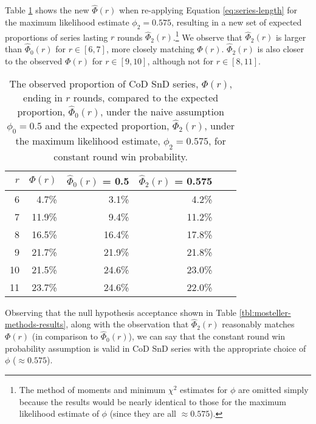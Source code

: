 \documentclass{article}
\begin{document}
Table \ref{tbl:alternative-constant-ps} shows the new \(\hat{\Phi}(r)\)
when re-applying Equation \ref{eq:series-length} for the maximum
likelihood estimate \(\phi_2 = 0.575\), resulting in a new set of
expected proportions of series lasting \(r\) rounds
\(\hat{\Phi}_2(r)\).\footnote{The method of moments and minimum
  \(\chi^2\) estimates for \(\phi\) are omitted simply because the
  results would be nearly identical to those for the maximum likelihood
  estimate of \(\phi\) (since they are all \(\approx 0.575\)).} We
observe that \(\hat{\Phi}_2(r)\) is larger than \(\hat{\Phi}_0(r)\) for
\(r \in [6, 7]\), more closely matching \(\Phi(r)\). \(\hat{\Phi}_2(r)\)
is also closer to the observed \(\Phi(r)\) for \(r \in [9, 10]\),
although not for \(r \in [8, 11]\).

\begin{table}
\caption{The observed proportion of CoD SnD series, $\Phi(r)$, ending in $r$ rounds, compared to the expected proportion, $\hat{\Phi}_0(r)$, under the naive assumption $\phi_0 = 0.5$ and the expected proportion, $\hat{\Phi}_2(r)$, under the maximum likelihood estimate, $\phi_2 = 0.575$, for constant round win probability.}

\centering
\begin{tabular}{rrrrrr}
\toprule
$r$ & $\Phi(r)$ & $\hat{\Phi}_0(r)$ = 0.5 & $\hat{\Phi}_2(r)$ = 0.575 \\
\midrule

6 & 4.7\% & 3.1\% & 4.2\% \\
7 & 11.9\% & 9.4\% & 11.2\% \\
8 & 16.5\% & 16.4\% & 17.8\% \\
9 & 21.7\% & 21.9\% & 21.8\% \\
10 & 21.5\% & 24.6\% & 23.0\% \\
11 & 23.7\% & 24.6\% & 22.0\% \\

\bottomrule
\end{tabular}

\label{tbl:alternative-constant-ps}

\end{table}

Observing that the null hypothesis acceptance shown in Table
\ref{tbl:mosteller-methods-results}, along with the observation that
\(\hat{\Phi}_2(r)\) reasonably matches \(\Phi(r)\) (in comparison to
\(\hat{\Phi}_0(r)\)), we can say that the constant round win probability
assumption is valid in CoD SnD series with the appropriate choice of
\(\phi\) (\(\approx 0.575\)).
\end{document}
